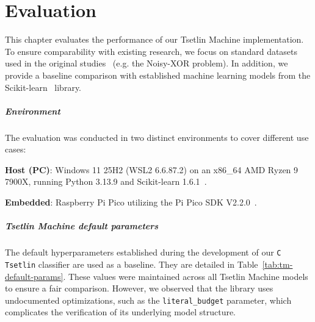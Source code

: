 \chapter{Evaluation}
\label{chap:evaluation}

This chapter evaluates the performance of our Tsetlin Machine implementation. To ensure comparability with existing research, we focus on standard datasets used in the original studies~\cite{granmo2021tsetlinmachinegame} (e.g. the Noisy-XOR problem). In addition, we provide a baseline comparison with established machine learning models from the Scikit-learn~\cite{scikit-learn} library.

\paragraph{Environment}
The evaluation was conducted in two distinct environments to cover different use cases:
\begin{compactitem}
    \item \textbf{Host (PC)}: Windows 11 25H2 (WSL2 6.6.87.2) on an x86\_64 AMD Ryzen 9 7900X, running Python 3.13.9 and Scikit-learn 1.6.1~\cite{scikit-learn}.
    \item \textbf{Embedded}: Raspberry Pi Pico utilizing the Pi Pico SDK V2.2.0~\cite{pico-sdk}.
\end{compactitem}

\paragraph{Tsetlin Machine default parameters}
The default hyperparameters established during the development of our \texttt{C Tsetlin} classifier are used as a baseline. They are detailed in Table~\ref{tab:tm-default-params}. These values were maintained across all Tsetlin Machine models to ensure a fair comparison. However, we observed that the \GreenTsetlinName library uses undocumented optimizations, such as the \texttt{literal\_budget} parameter, which complicates the verification of its underlying model structure.

